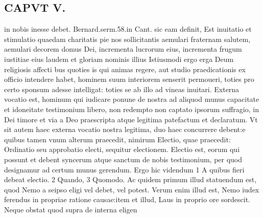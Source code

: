 \documentclass{article}
\begin{document}
\begin{pages}
\section*{CAPVT V. }
\marginpar{[ p.345 ]}\pstart in nobis inesse debet. Bernard.serm.58.in Cant. sic eam definit, Est inuitatio et stimulatio quaedam charitatis pie nos sollicitantis aemulari fraternam salutem, aemulari decorem domus Dei, incrementa lucrorum eius, incrementa frugum iustitiae eius laudem et gloriam nominis illius Istiusmodi ergo erga Deum religiosis affecti bus quoties is qui animas regere, aut studio praedicationis ex officio intendere habet, hominem suum interiorem senserit permoueri, toties pro certo sponsum adesse intelligat: toties se ab illo ad vineas inuitari.  \pend\pstart Externa vocatio est, hominum qui iudicare ponune de nostra ad aliquod munus capacitate et idoneitate testimonium libero, non redempto non captato ipsorum suffragio, in Dei timore et via a Deo praescripta atque legitima patefactum et declaratum.  \pend\pstart Vt sit autem haec externa vocatio nostra legitima, duo haec concurrere debent:e quibus tamen vnum alterum praecedit, nimirum Electio, quae praecedit: Ordinatio seu approbatio electi, sequitur electionem.  \pend\pstart Electio est, eorum qui possunt et debent syncerum atque sanctum de nobis testimonium, per quod designamur ad certum munus gerendum.  \pend\pstart Ergo hic videndum 1 A quibus fieri debeat electio. 2 Quando, 3 Quomodo. Ac quidem primum illud statuendum est, quod Nemo a seipso eligi vel debet, vel potest. Verum enim illud est, Nemo iudex ferendus in propriae ratione causae:item et illud, Laus in proprio ore sordescit. Neque obstat quod supra de interna eligen\pend

\end{pages}
\end{document}
